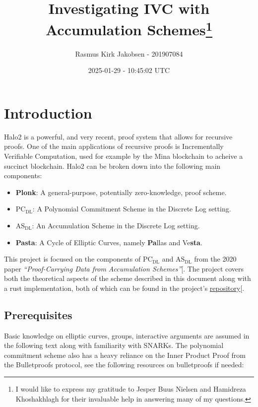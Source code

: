 \documentclass[
]{article}
\title{Investigating IVC with Accumulation Schemes\thanks{I would like
to express my gratitude to Jesper Buus Nielsen and Hamidreza
Khoshakhlagh for their invaluable help in answering many of my
questions.}}
\author{Rasmus Kirk Jakobsen - 201907084}
\date{2025-01-29 - 10:45:02 UTC}
\providecommand{\tightlist}{%
  \setlength{\itemsep}{0pt}\setlength{\parskip}{0pt}}
\newcommand*{\PCDL}{\text{PC}_{\text{DL}}}
\newcommand*{\ASDL}{\text{AS}_{\text{DL}}}
\begin{document}
\maketitle

{
\hypersetup{linkcolor=gray}
\setcounter{tocdepth}{3}
\tableofcontents
}
\section{Introduction}\label{introduction}

Halo2 is a powerful, and very recent, proof system that allows for
recursive proofs. One of the main applications of recursive proofs is
Incrementally Verifiable Computation, used for example by the Mina
blockchain to acheive a succinct blockchain. Halo2 can be broken down
into the following main components:

\begin{itemize}
\tightlist
\item
  \textbf{Plonk}: A general-purpose, potentially zero-knowledge, proof
  scheme.
\item
  \textbf{\(\PCDL\)}: A Polynomial Commitment Scheme in the Discrete Log
  setting.
\item
  \textbf{\(\ASDL\)}: An Accumulation Scheme in the Discrete Log
  setting.
\item
  \textbf{Pasta}: A Cycle of Elliptic Curves, namely \textbf{Pa}llas and
  Ve\textbf{sta}.
\end{itemize}

This project is focused on the components of \(\PCDL\) and \(\ASDL\)
from the 2020 paper \emph{``Proof-Carrying Data from Accumulation
Schemes''}{[}\citeproc{ref-pcd}{Bünz et al. 2020}{]}. The project covers
both the theoretical aspects of the scheme described in this document
along with a rust implementation, both of which can be found in the
project's
\href{https://github.com/rasmus-kirk/halo-accumulation}{repository}{[}\citeproc{ref-repo}{Jakobsen
2025}{]}.

\subsection{Prerequisites}\label{prerequisites}

Basic knowledge on elliptic curves, groups, interactive arguments are
assumed in the following text along with familiarity with SNARKs. The
polynomial commitment scheme also has a heavy reliance on the Inner
Product Proof from the Bulletproofs protocol, see the following
resources on bulletproofs if needed:
\end{document}
